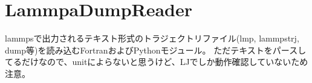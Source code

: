 \chapter{Lammpa\+Dump\+Reader}
\hypertarget{md__2home_2prose_2wrk_2CGPolyAna_2src_2LammpsDumpReader_2README}{}\label{md__2home_2prose_2wrk_2CGPolyAna_2src_2LammpsDumpReader_2README}
\label{md__2home_2prose_2wrk_2CGPolyAna_2src_2LammpsDumpReader_2README_autotoc_md4}%
%
 lammpsで出力されるテキスト形式のトラジェクトリファイル({\ttfamily lmp, lammpstrj, dump}等)を読み込む\+Fortranおよび\+Pythonモジュール。 ただテキストをパースしてるだけなので、unitによらないと思うけど、\+LJでしか動作確認していないため注意。 